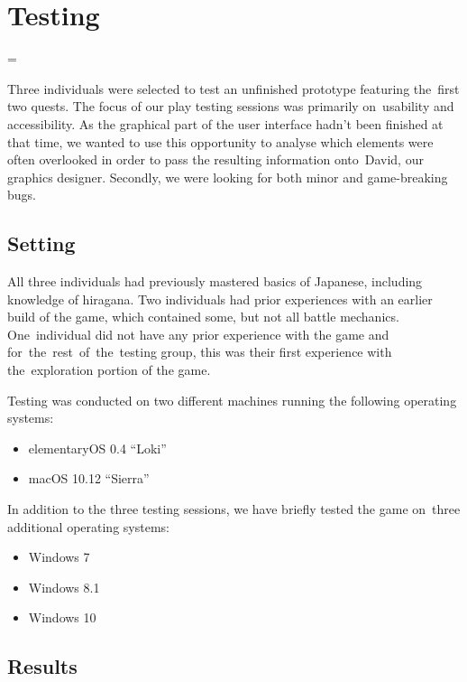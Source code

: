 \documentclass[thesis=B,english,hidelinks]{FITthesisXE}[2012/06/26]
\begin{document}
\chapter{Testing}

\emergencystretch=\maxdimen
{}

Three individuals were selected to test an unfinished prototype featuring the~first two quests. The focus of our play testing sessions was primarily on~usability and accessibility. As the graphical part of the user interface hadn't been finished at that time, we wanted to use this opportunity to analyse which elements were often overlooked in order to pass the resulting information onto~David, our graphics designer. Secondly, we were looking for both minor and game-breaking bugs.

\section{Setting}

All three individuals had previously mastered basics of Japanese, including knowledge of hiragana. Two individuals had prior experiences with an earlier build of the game, which contained some, but not all battle mechanics. One~individual did not have any prior experience with the game and for~the~rest~of~the~testing group, this was their first experience with the~exploration portion of the game.

\newpage

Testing was conducted on two different machines running the following operating systems:

\begin{itemize}
\item elementaryOS 0.4 ``Loki''
\item macOS 10.12 ``Sierra''
\end{itemize}

In addition to the three testing sessions, we have briefly tested the game on~three additional operating systems:

\begin{itemize}
\item Windows 7
\item Windows 8.1
\item Windows 10
\end{itemize}

\section{Results}
\end{document}

